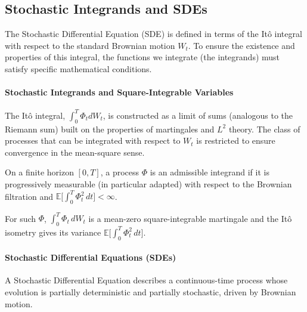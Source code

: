 \subsection{Stochastic Integrands and SDEs}
The Stochastic Differential Equation (SDE) is defined in terms of the Itô integral with respect to the standard Brownian motion $W_t$. To ensure the existence and properties of this integral, the functions we integrate (the integrands) must satisfy specific mathematical conditions.
\paragraph{Stochastic Integrands and Square-Integrable Variables}
The Itô integral, $\int_0^T \Phi_t dW_t$, is constructed as a limit of sums (analogous to the Riemann sum) built on the properties of martingales and $L^2$ theory. The class of processes that can be integrated with respect to $W_t$ is restricted to ensure convergence in the mean-square sense.

\begin{definition}
On a finite horizon $[0,T]$, a process $\Phi$ is an admissible integrand if it is
progressively measurable (in particular adapted) with respect to the Brownian
filtration and $\mathbb{E}\big[\int_0^T \Phi_t^2\,dt\big]<\infty$.
\end{definition}
For such $\Phi$, $\int_0^T \Phi_t\,dW_t$ is a mean-zero square-integrable martingale
and the It\^o isometry gives its variance $\mathbb{E}\big[\int_0^T \Phi_t^2\,dt\big]$.
\paragraph{Stochastic Differential Equations (SDEs)}
A Stochastic Differential Equation describes a continuous-time process whose evolution is partially deterministic and partially stochastic, driven by Brownian motion.

